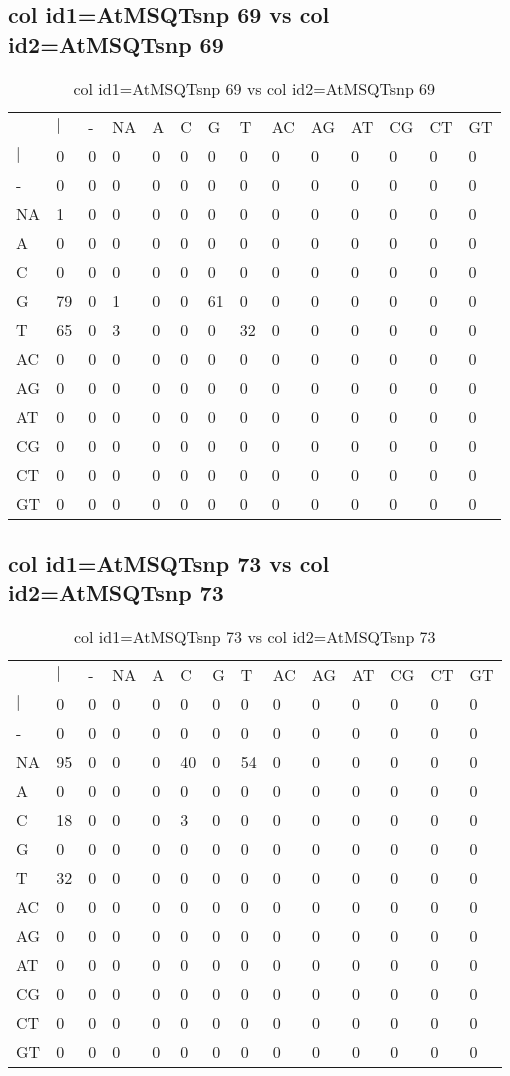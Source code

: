 \subsection{col id1=AtMSQTsnp 69 vs col id2=AtMSQTsnp 69}
\begin{center}
\begin{longtable}{|l|l|l|l|l|l|l|l|l|l|l|l|l|l|}
\caption{col id1=AtMSQTsnp 69 vs col id2=AtMSQTsnp 69} \label{table_dm760}\\
\hline
\\
\hline
&$|$&-&NA&A&C&G&T&AC&AG&AT&CG&CT&GT\\
$|$&0&0&0&0&0&0&0&0&0&0&0&0&0\\
-&0&0&0&0&0&0&0&0&0&0&0&0&0\\
NA&1&0&0&0&0&0&0&0&0&0&0&0&0\\
A&0&0&0&0&0&0&0&0&0&0&0&0&0\\
C&0&0&0&0&0&0&0&0&0&0&0&0&0\\
G&79&0&1&0&0&61&0&0&0&0&0&0&0\\
T&65&0&3&0&0&0&32&0&0&0&0&0&0\\
AC&0&0&0&0&0&0&0&0&0&0&0&0&0\\
AG&0&0&0&0&0&0&0&0&0&0&0&0&0\\
AT&0&0&0&0&0&0&0&0&0&0&0&0&0\\
CG&0&0&0&0&0&0&0&0&0&0&0&0&0\\
CT&0&0&0&0&0&0&0&0&0&0&0&0&0\\
GT&0&0&0&0&0&0&0&0&0&0&0&0&0\\
\hline
\end{longtable}
\end{center}

\subsection{col id1=AtMSQTsnp 73 vs col id2=AtMSQTsnp 73}
\begin{center}
\begin{longtable}{|l|l|l|l|l|l|l|l|l|l|l|l|l|l|}
\caption{col id1=AtMSQTsnp 73 vs col id2=AtMSQTsnp 73} \label{table_dm762}\\
\hline
\\
\hline
&$|$&-&NA&A&C&G&T&AC&AG&AT&CG&CT&GT\\
$|$&0&0&0&0&0&0&0&0&0&0&0&0&0\\
-&0&0&0&0&0&0&0&0&0&0&0&0&0\\
NA&95&0&0&0&40&0&54&0&0&0&0&0&0\\
A&0&0&0&0&0&0&0&0&0&0&0&0&0\\
C&18&0&0&0&3&0&0&0&0&0&0&0&0\\
G&0&0&0&0&0&0&0&0&0&0&0&0&0\\
T&32&0&0&0&0&0&0&0&0&0&0&0&0\\
AC&0&0&0&0&0&0&0&0&0&0&0&0&0\\
AG&0&0&0&0&0&0&0&0&0&0&0&0&0\\
AT&0&0&0&0&0&0&0&0&0&0&0&0&0\\
CG&0&0&0&0&0&0&0&0&0&0&0&0&0\\
CT&0&0&0&0&0&0&0&0&0&0&0&0&0\\
GT&0&0&0&0&0&0&0&0&0&0&0&0&0\\
\hline
\end{longtable}
\end{center}

